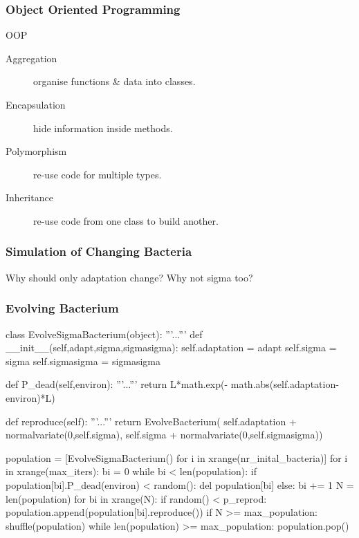 \begin{frame}[fragile] 
\frametitle{Object Oriented Programming}

\begin{block}{OOP}
\begin{description}
\item[\alert{Aggregation}] organise functions \& data into classes.
\item[\alert{Encapsulation}] hide information inside methods.
\item[Polymorphism] re-use code for multiple types.
\item[Inheritance] re-use code from one class to build another.
\end{description}
\end{block}
\end{frame}

\begin{frame}[fragile]
\frametitle{Simulation of Changing Bacteria}

Why should only adaptation change? Why not \alert{sigma} too?

\end{frame}

\begin{frame}[fragile]
\frametitle{Evolving Bacterium}

\begin{python}
class EvolveSigmaBacterium(object):
    '''...'''
    def __init__(self,adapt,sigma,sigmasigma):
        self.adaptation = adapt
        self.sigma = sigma
        self.sigmasigma = sigmasigma

    def P_dead(self,environ):
        '''...'''
        return L*math.exp(-
                math.abs(self.adaptation-environ)*L)
    
    def reproduce(self):
        '''...'''
        return EvolveBacterium(
            self.adaptation + normalvariate(0,self.sigma),
            self.sigma + normalvariate(0,self.sigmasigma))
\end{python}
\end{frame}

\begin{frame}[fragile]
\begin{python}
population = [EvolveSigmaBacterium()
        for i in xrange(nr_inital_bacteria)]
for i in xrange(max_iters):
    bi = 0
    while bi < len(population):
        if population[bi].P_dead(environ) < random():
            del population[bi]
        else:
            bi += 1
    N = len(population)
    for bi in xrange(N):
        if random() < p_reprod:
            population.append(population[bi].reproduce())
    if N >= max_population:
        shuffle(population)
        while len(population) >= max_population:
            population.pop()
\end{python}
\end{frame}

